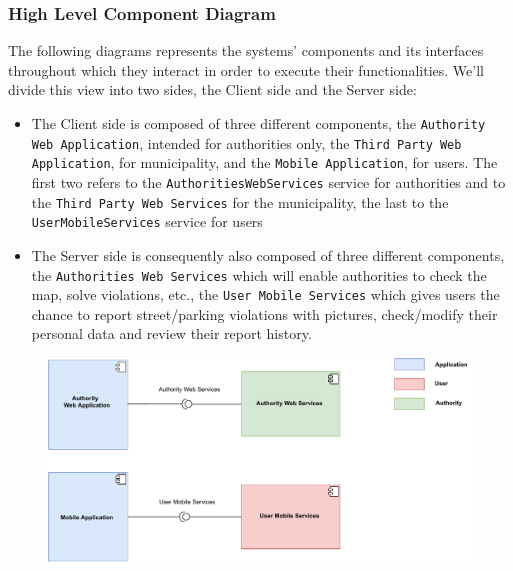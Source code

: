 \documentclass[12pt,a4paper]{article}
\begin{document}
\subsubsection{High Level Component Diagram}
The following diagrams represents the systems' components and its interfaces throughout which they interact in order to execute their functionalities. We'll divide this view into two sides, the Client side and the Server side:
\begin{itemize}
\item The Client side is composed of three different components, the \texttt{Authority Web Application}, intended for authorities only, the \texttt{Third Party Web Application}, for municipality, and the \texttt{Mobile Application}, for users. The first two refers to the \texttt{AuthoritiesWebServices} service for authorities and to the \texttt{Third Party Web Services} for the municipality, the last to the \texttt{UserMobileServices} service for users
\item The Server side is consequently also composed of three different components, the \texttt{Authorities Web Services} which will enable authorities to check the map, solve violations, etc., the \texttt{User Mobile Services} which gives users the chance to report street/parking violations with pictures, check/modify their personal data and review their report history.
\end{itemize}
\begin{figure}[H]
		\centering
		\includegraphics[width=1.2\linewidth]{../assets/images/component_no3rdparty.pdf}
	\end{figure}

\newpage
\end{document}
